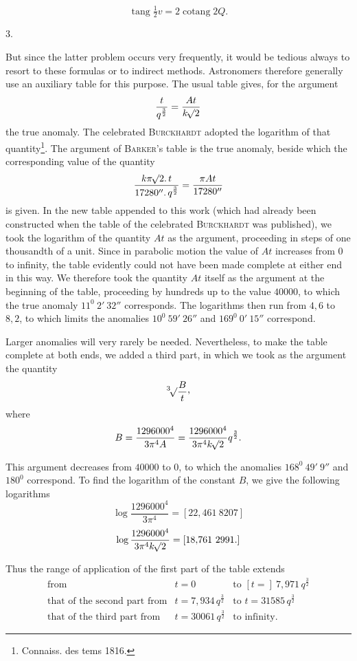 \[
\operatorname{tang}\tfrac12v=2\operatorname{cotang}2Q.
\]
\par\medskip
{}
\begin{center}3.\end{center}
\noindent\hspace*{\parindent}But since the latter problem occurs very frequently, it would be tedious always to resort to these formulas or to indirect methods. Astronomers therefore generally use an auxiliary table for this purpose. The usual table gives, for the argument
\[
\frac{t}{q^{\frac32}}=\frac{At}{k\mathord{{}^{}\!\surd}2}
\]
the true anomaly. The celebrated \textsc{Burckhardt} adopted the logarithm of that quantity\footnote{Connaiss. des tems 1816.}. The argument of \textsc{Barker}'s table is the true anomaly, beside which the corresponding value of the quantity
\[
\frac{k\pi\mathord{{}^{}\!\surd}2\mathpunct{.}t}{17280''\mathpunct{.}q^{\frac32}}=\frac{\pi At}{17280''}
\]
is given. In the new table appended to this work (which had already been constructed when the table of the celebrated \textsc{Burckhardt} was published), we took the logarithm of the quantity \(At\) as the argument, proceeding in steps of one thousandth of a unit. Since in parabolic motion the value of \(At\) increases from \(0\) to infinity, the table evidently could not have been made complete at either end in this way. We therefore took the quantity \(At\) itself as the argument at the beginning of the table, proceeding by hundreds up to the value \(40000\), to which the true anomaly \(11^0\ 2'\ 32''\) corresponds. The logarithms then run from \(4{,}6\) to \(8{,}2\), to which limits the anomalies \(10^0\ 59'\ 26''\) and \(169^0\ 0'\ 15''\) correspond.
\par
{}
Larger anomalies will very rarely be needed. Nevertheless, to make the table complete at both ends, we added a third part, in which we took as the argument the quantity
\[
\BareRoot[3]{\frac{B}{t}}\mathpunct{\raisebox{.45ex}{,}}
\]
where
\[
B=\frac{1296000^4}{3\pi^4A}=\frac{1296000^4}{3\pi^4k\mathord{{}^{}\!\surd}2}q^{\frac32}.
\]
\par
This argument decreases from \(40000\) to \(0\), to which the anomalies \(168^0\ 49'\ 9''\) and \(180^0\) correspond. To find the logarithm of the constant \(B\), we give the following logarithms
\[
\log\frac{1296000^4}{3\pi^4}=[22{,}461\ 8207]
\]
\[
\log\frac{1296000^4}{3\pi^4k\BareRoot{2}}=[18{,}761\ 2991.]
\]
\par
Thus the range of application of the first part of the table extends
\[
\begin{array}{rll}
\text{from}&t=0&\text{to }[t=]\ 7{,}971\,q^{\frac32}\\
\text{that of the second part from}&t=7{,}934\,q^{\frac32}&\text{to }t=31585\,q^{\frac32}\\
\text{that of the third part from}&t=30061\,q^{\frac32}&\text{to infinity.}
\end{array}
\]
